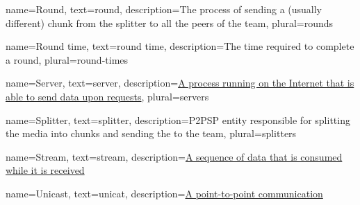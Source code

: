  {
    name={Round},
    text={round},
    description={The process of sending a (usually different) chunk from the splitter to all the peers of the team},
    plural={rounds}
}

 {
    name={Round time},
    text={round time},
    description={The time required to complete a round},
    plural={round-times}
}

 {
    name={Server},
    text={server},
    description={\href{https://en.wikipedia.org/wiki/Server_(computing)}{A process running on the Internet that is able to send data upon requests}},
    plural={servers}
}

 {
    name={Splitter},
    text={splitter},
    description={P2PSP entity responsible for splitting the \gls{media} into chunks and sending the to the team},
    plural={splitters}
}

 {
    name={Stream},
    text={stream},
    description={\href{https://en.wikipedia.org/wiki/Streaming_media}{A sequence of data that is consumed while it is received}}
}



 {
    name={Unicast},
    text={unicat},
    description={\href{https://en.wikipedia.org/wiki/Unicast}{A point-to-point communication}}
}

